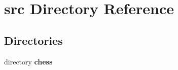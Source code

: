 \section{src Directory Reference}
\label{dir_68267d1309a1af8e8297ef4c3efbcdba}
\subsection*{Directories}
\begin{DoxyCompactItemize}
\item 
directory {\bf chess}
\end{DoxyCompactItemize}
